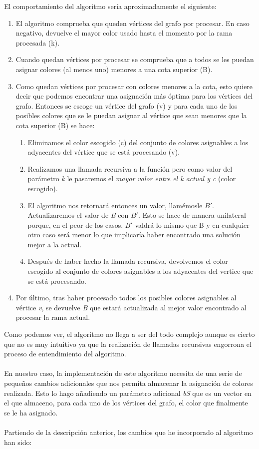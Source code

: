 \documentclass[british,a4paper,11pt,titlepage]{article}
\begin{document}
    El comportamiento del algoritmo sería aproximadamente el siguiente:
    \begin{enumerate}
        \item El algoritmo comprueba que queden vértices del grafo por procesar. En caso negativo, devuelve el mayor color usado hasta el momento por la rama procesada (k).
        \item Cuando quedan vértices por procesar se comprueba que a todos se les puedan asignar colores (al menos uno) menores a una cota superior (B).
        \item Como quedan vértices por procesar con colores menores a la cota, esto quiere decir que podemos encontrar una asignación más óptima para los vértices del grafo. Entonces se escoge un vértice del grafo (v) y para cada uno de los posibles colores que se le puedan asignar al vértice que sean menores que la cota superior (B) se hace:
        \begin{enumerate}
            \item Eliminamos el color escogido (c) del conjunto de colores asignables a los adyacentes del vértice que se está procesando (v).
            \item Realizamos una llamada recursiva a la función pero como valor del parámetro \textit{k} le pasaremos el \emph{mayor valor entre el \textit{k} actual y c} (color escogido).
            \item El algoritmo nos retornará entonces un valor, llamémosle $B'$.
            Actualizaremos el valor de \textit{B} con $B'$. Esto se hace de manera unilateral porque, en el peor de los casos, $B'$ valdrá lo mismo que B y en cualquier otro caso será menor lo que implicaría haber encontrado una solución mejor a la actual.
            \item Después de haber hecho la llamada recursiva, devolvemos el color escogido al conjunto de colores asignables a los adyacentes del vertice que se está procesando.
        \end{enumerate}
        \item Por último, tras haber procesado todos los posibles colores asignables al vértice \textit{v}, se devuelve \textit{B} que estará actualizada al mejor valor encontrado al procesar la rama actual.
    \end{enumerate}

    Como podemos ver, el algoritmo no llega a ser del todo complejo aunque es cierto que no es muy intuitivo ya que la realización de llamadas recursivas engorrona el proceso de entendimiento del algoritmo.
    \\
    \\
    En nuestro caso, la implementación de este algoritmo necesita de una serie de pequeños cambios adicionales que nos permita almacenar la asignación de colores realizada. Esto lo hago añadiendo un parámetro adicional \emph{bS} que es un vector en el que almaceno, para cada uno de los vértices del grafo, el color que finalmente se le ha asignado.
    \\
    \\
    Partiendo de la descripción anterior, los cambios que he incorporado al algoritmo han sido:
\end{document}
